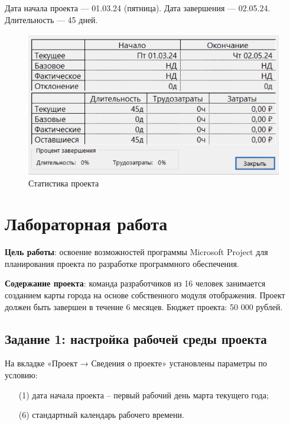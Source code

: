 Дата начала проекта --- 01.03.24 (пятница). Дата завершения --- 02.05.24. Длительность --- 45 дней.

\begin{figure}[h!]
	\begin{center}
		\includegraphics[scale=0.8]{inc/img/p_3.png}
	\end{center}
	\captionsetup{justification=centering}
	\caption{Статистика проекта}
	\label{fig:u3}
\end{figure}

\section*{Лабораторная работа}

\textbf{Цель работы}: освоение возможностей программы Microsoft Project для планирования
проекта по разработке программного обеспечения.



\textbf{Содержание проекта}: команда разработчиков из 16 человек занимается созданием карты города на основе собственного модуля отображения. Проект должен быть завершен в течение 6 месяцев. Бюджет проекта: 50 000 рублей.

\subsection*{Задание 1: настройка рабочей среды проекта}

На вкладке «Проект → Сведения о проекте» установлены параметры по
условию:

\begin{itemize}
    \item[(1)] дата начала проекта – первый рабочий день марта текущего года;
    \item[(6)] стандартный календарь рабочего времени.
\end{itemize}

